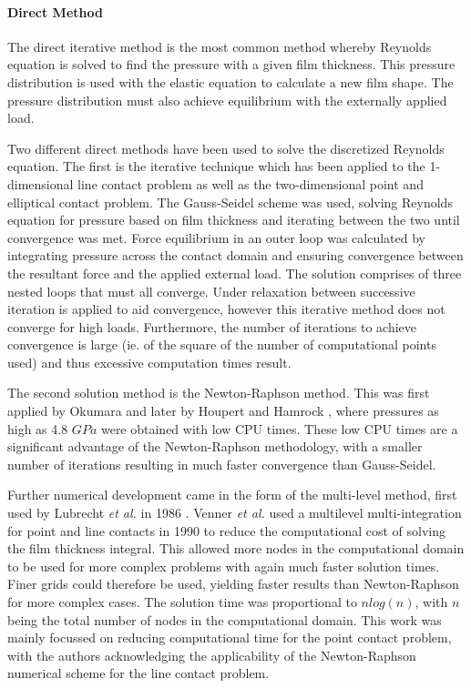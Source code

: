 \paragraph{Direct Method}

The direct iterative method is the most common method whereby Reynolds equation is solved to find the pressure with a given film thickness. This pressure distribution is used with the elastic equation to calculate a new film shape. The pressure distribution must also achieve equilibrium with the externally applied load.

Two different direct methods have been used to solve the discretized Reynolds equation. The first is the iterative technique which has been applied to the 1-dimensional line contact problem \cite{Hamrock1984} as well as the two-dimensional point \cite{Hamrock1976a} and elliptical \cite{Chittenden1985} contact problem. The Gauss-Seidel scheme was used, solving Reynolds equation for pressure based on film thickness and iterating between the two until convergence was met. Force equilibrium in an outer loop was calculated by integrating pressure across the contact domain and ensuring convergence between the resultant force and the applied external load. The solution comprises of three nested loops that must all converge. Under relaxation between successive iteration is applied to aid convergence, however this iterative method does not converge for high loads. Furthermore, the number of iterations to achieve convergence is large (ie. of the square of the number of computational points used) and thus excessive computation times result.

The second solution method is the Newton-Raphson method. This was first applied by Okumara \cite{Okumara1982} and later by Houpert and Hamrock \cite{Houpert1985}, where pressures as high as 4.8 $GPa$ were obtained with low CPU times. These low CPU times are a significant advantage of the Newton-Raphson methodology, with a smaller number of iterations resulting in much faster convergence than Gauss-Seidel.

Further numerical development came in the form of the multi-level method, first used by Lubrecht \textit{et al.} in 1986 \cite{Lubrecht1986}. Venner \textit{et al.} \cite{Venner1990} used a multilevel multi-integration for point and line contacts in 1990 to reduce the computational cost of solving the film thickness integral. This allowed more nodes in the computational domain to be used for more complex problems with again much faster solution times. Finer grids could therefore be used, yielding faster results than Newton-Raphson for more complex cases. The solution time was proportional to $n log(n)$, with $n$ being the total number of nodes in the computational domain. This work was mainly focussed on reducing computational time for the point contact problem, with the authors acknowledging the applicability of the Newton-Raphson numerical scheme for the line contact problem.

